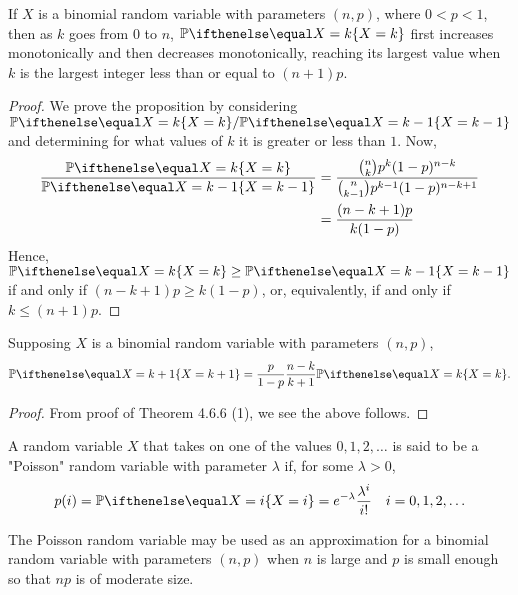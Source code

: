 \documentclass[a4paper,8pt]{article}
\begin{document}
\begin{outline}
    If \(X\) is a binomial random variable with parameters \((n, p)\), where \(0 < p < 1\), then as \(k\) goes
    from \(0\) to \(n\), \(\bbp[X=k]\) first increases monotonically and then decreases monotonically, reaching
    its largest value when \(k\) is the largest integer less than or equal to \((n+1)p\).

    \pagebreak
    \begin{proof}
      We prove the proposition by considering \(\bbp[X=k]/\bbp[X=k-1]\) and determining for what values of
      \(k\) it is greater or less than \(1\). Now,
      \begin{align}
        \frac{\bbp[X=k]}{\bbp[X=k-1]} &= \frac{\binom{n}{k}p^k(1-p)^{n-k}}
                                              {\binom{n}{k-1}p^{k-1}(1-p)^{n-k+1}}\nonumber \\
                                      &= \frac{(n-k+1)p}{k(1-p)}
      \end{align}
      Hence, \(\bbp[X=k] \geq \bbp[X=k-1]\) if and only if \((n-k+1)p \geq k(1-p)\), or, equivalently, if and only
      if \(k \leq (n+1)p\).
    \end{proof}

    Supposing \(X\) is a binomial random variable with parameters \((n,p)\),
    \[ \bbp[X=k+1] = \frac{p}{1-p}\frac{n-k}{k+1}\bbp[X=k]\text{.} \]

    \begin{proof}
      From proof of Theorem 4.6.6 (1), we see the above follows.
    \end{proof}

    A random variable \(X\) that takes on one of the values \(0, 1, 2, \ldots\) is said to be a
    "Poisson" random variable with parameter \(\lambda\) if, for some \(\lambda > 0\), \[ p(i) = \bbp[X=i]
    = e^{-\lambda}\frac{\lambda^i}{i!}\quad i=0,1,2,\ldots \]

      The Poisson random variable may be used as an approximation for a binomial random variable with
      parameters \((n,p)\) when \(n\) is large and \(p\) is small enough so that \(np\) is of moderate size.


\end{outline}
\end{document}
